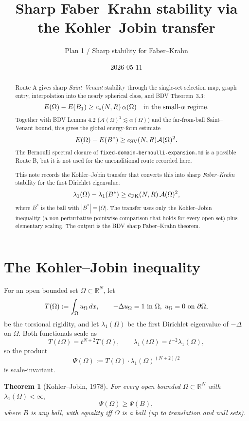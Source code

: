 \documentclass[11pt]{article}
\title{Sharp Faber--Krahn stability via the Kohler--Jobin transfer}
\author{Plan 1 / Sharp stability for Faber--Krahn}
\date{2026-05-11}
\newtheorem{theorem}{Theorem}
\theoremstyle{definition}
\newcommand{\R}{\mathbb{R}}
\newcommand{\abs}[1]{\left|#1\right|}
\renewcommand{\d}{\,d}
\begin{document}
\maketitle

\begin{abstract}
Route A gives sharp \emph{Saint--Venant} stability through the single-set
selection map, graph entry, interpolation into the nearly spherical class,
and BDV Theorem~3.3:
\[
E(\Omega)-E(B_1)\ge c_*(N,R)\,\alpha(\Omega)
\quad\hbox{in the small-\(\alpha\) regime}.
\]
Together with BDV Lemma 4.2
($\mathcal A(\Omega)^2\lesssim\alpha(\Omega)$) and the far-from-ball
Saint--Venant bound, this gives the global energy-form estimate
\[
E(\Omega)-E(B^*)\ge c_{\rm SV}(N,R)\mathcal A(\Omega)^2.
\]
The Bernoulli spectral closure of
\texttt{fixed-domain-bernoulli-expansion.md} is a possible Route B, but it is
not used for the unconditional route recorded here.

This note records the Kohler--Jobin transfer that converts this into sharp
\emph{Faber--Krahn} stability for the first Dirichlet eigenvalue:
\[
\lambda_1(\Omega)-\lambda_1(B^*)\ge c_{\rm FK}(N,R)\,\mathcal A(\Omega)^2,
\]
where $B^*$ is the ball with $\abs{B^*}=\abs{\Omega}$. The transfer uses
only the Kohler--Jobin inequality (a non-perturbative pointwise comparison
that holds for every open set) plus elementary scaling. The output is the
BDV sharp Faber--Krahn theorem.
\end{abstract}

\section{The Kohler--Jobin inequality}\label{sec:kj}

For an open bounded set $\Omega\subset\R^N$, let
\[
T(\Omega):=\int_\Omega u_\Omega\d x,\qquad
-\Delta u_\Omega=1\hbox{ in }\Omega,\;u_\Omega=0\hbox{ on }\partial\Omega,
\]
be the torsional rigidity, and let $\lambda_1(\Omega)$ be the first Dirichlet
eigenvalue of $-\Delta$ on $\Omega$. Both functionals scale as
\[
T(t\Omega)=t^{N+2}T(\Omega),\qquad\lambda_1(t\Omega)=t^{-2}\lambda_1(\Omega),
\]
so the product
\[
\Psi(\Omega):=T(\Omega)\cdot\lambda_1(\Omega)^{(N+2)/2}
\]
is scale-invariant.

\begin{theorem}[Kohler--Jobin, 1978]\label{thm:kj}
For every open bounded $\Omega\subset\R^N$ with $\lambda_1(\Omega)<\infty$,
\[
\Psi(\Omega)\ge\Psi(B),
\]
where $B$ is any ball, with equality iff $\Omega$ is a ball (up to translation
and null sets).
\end{theorem}
\end{document}
